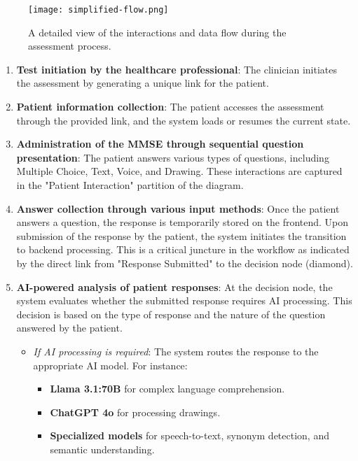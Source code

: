 \begin{figure}[h!]
\begin{center}
\texttt{[image: simplified-flow.png]}
\caption{A detailed view of the interactions and data flow during the assessment process.}
\label{fig:assessment-flow}
\end{center}
\end{figure}

\begin{enumerate}
    \item \textbf{Test initiation by the healthcare professional}: The clinician initiates the assessment by generating a unique link for the patient.
    \item \textbf{Patient information collection}: The patient accesses the assessment through the provided link, and the system loads or resumes the current state.
    \item \textbf{Administration of the MMSE through sequential question presentation}: The patient answers various types of questions, including Multiple Choice, Text, Voice, and Drawing. These interactions are captured in the "Patient Interaction" partition of the diagram.
    \item \textbf{Answer collection through various input methods}: Once the patient answers a question, the response is temporarily stored on the frontend. Upon submission of the response by the patient, the system initiates the transition to backend processing. This is a critical juncture in the workflow as indicated by the direct link from "Response Submitted" to the decision node (diamond).
    \item \textbf{AI-powered analysis of patient responses}: At the decision node, the system evaluates whether the submitted response requires AI processing. This decision is based on the type of response and the nature of the question answered by the patient.
    \begin{itemize}
        \item \textit{If AI processing is required}: The system routes the response to the appropriate AI model. For instance:
        \begin{itemize}
            \item \textbf{Llama 3.1:70B} for complex language comprehension.
            \item \textbf{ChatGPT 4o} for processing drawings.
            \item \textbf{Specialized models} for speech-to-text, synonym detection, and semantic understanding.
        \end{itemize}

\end{itemize}
\end{enumerate}
